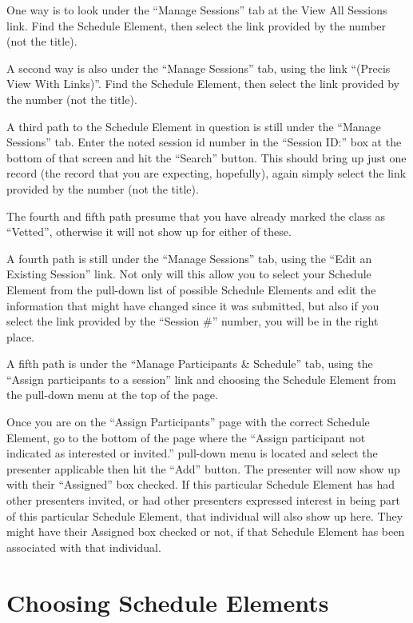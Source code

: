 \documentclass[tablesignature]{scrartcl}
\begin{document}
   One way is to look under the ``Manage Sessions'' tab at the View All
   Sessions link.  Find the Schedule Element, then select the link
   provided by the number (not the title).

   A second way is also under the ``Manage Sessions'' tab, using the
   link ``(Precis View With Links)''.  Find the Schedule Element, then
   select the link provided by the number (not the title).

   A third path to the Schedule Element in question is still under the
   ``Manage Sessions'' tab. Enter the noted session id number in the
   ``Session ID:'' box at the bottom of that screen and hit the ``Search''
   button.  This should bring up just one record (the record that you
   are expecting, hopefully), again simply select the link provided by
   the number (not the title).

   The fourth and fifth path presume that you have already marked the
   class as ``Vetted'', otherwise it will not show up for either of
   these.

   A fourth path is still under the ``Manage Sessions'' tab, using the
   ``Edit an Existing Session'' link.  Not only will this allow you to
   select your Schedule Element from the pull-down list of possible
   Schedule Elements and edit the information that might have changed
   since it was submitted, but also if you select the link provided by
   the ``Session \#'' number, you will be in the right place.

   A fifth path is under the ``Manage Participants \& Schedule'' tab,
   using the ``Assign participants to a session'' link and choosing the
   Schedule Element from the pull-down menu at the top of the page.

   Once you are on the ``Assign Participants'' page with the correct
   Schedule Element, go to the bottom of the page where the ``Assign
   participant not indicated as interested or invited.'' pull-down menu
   is located and select the presenter applicable then hit the ``Add''
   button.  The presenter will now show up with their ``Assigned'' box
   checked.  If this particular Schedule Element has had other
   presenters invited, or had other presenters expressed interest in
   being part of this particular Schedule Element, that individual
   will also show up here.  They might have their Assigned box checked
   or not, if that Schedule Element has been associated with that
   individual.
\section{Choosing Schedule Elements}
\label{sec-6}
\end{document}
